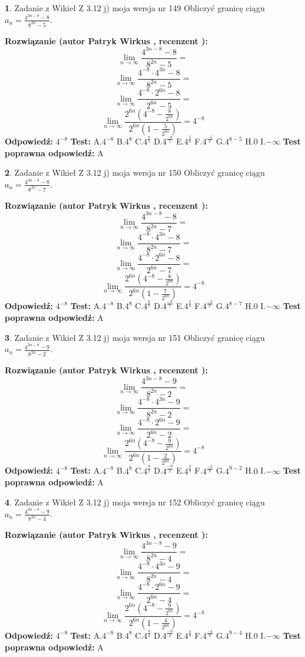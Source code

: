 \documentclass[12pt, a4paper]{article}
\theoremstyle{definition} %
\newtheorem{zad}{}
\newcommand{\zadStart}[1]{\begin{zad}#1\newline}
\newcommand{\zadStop}{\end{zad}}
\newcommand{\rozwStart}[2]{\noindent \textbf{Rozwiązanie (autor #1 , recenzent #2): }\newline}
\newcommand{\rozwStop}{\newline}
\newcommand{\odpStart}{\noindent \textbf{Odpowiedź:}\newline}
\newcommand{\odpStop}{\newline}
\newcommand{\testStart}{\noindent \textbf{Test:}\newline}
\newcommand{\testStop}{\newline}
\newcommand{\kluczStart}{\noindent \textbf{Test poprawna odpowiedź:}\newline}
\newcommand{\kluczStop}{\newline}
\begin{document}
\zadStart{Zadanie z Wikieł Z 3.12 j) moja wersja nr 149}
Obliczyć granicę ciągu $a_{n}=\frac{4^{3n-8}-8}{8^{2n}-5}$.
\zadStop
\rozwStart{Patryk Wirkus}{}
$$\lim\limits_{n\to\infty}\frac{4^{3n-8}-8}{8^{2n}-5}=$$
$$\lim\limits_{n\to\infty}\frac{4^{-8} \cdot 4^{3n}-8}{8^{2n}-5}=$$
$$\lim\limits_{n\to\infty}\frac{4^{-8} \cdot 2^{6n}-8}{2^{6n}-5}=$$
$$\lim\limits_{n\to\infty}\frac{2^{6n}(4^{-8} - \frac{8}{2^{6n}})}{2^{6n}(1-\frac{5}{2^{6n}})}= 4^{-8}$$
\rozwStop
\odpStart
$4^{-8}$
\odpStop
\testStart
A.$4^{-8}$
B.$4^{8}$
C.$4^{\frac{8}{5}}$
D.$4^{\frac{-8}{5}}$
E.$4^{\frac{5}{8}}$
F.$4^{\frac{-5}{8}}$
G.$4^{8-5}$
H.$0$
I.$-\infty$
\testStop
\kluczStart
A
\kluczStop



\zadStart{Zadanie z Wikieł Z 3.12 j) moja wersja nr 150}
Obliczyć granicę ciągu $a_{n}=\frac{4^{3n-8}-8}{8^{2n}-7}$.
\zadStop
\rozwStart{Patryk Wirkus}{}
$$\lim\limits_{n\to\infty}\frac{4^{3n-8}-8}{8^{2n}-7}=$$
$$\lim\limits_{n\to\infty}\frac{4^{-8} \cdot 4^{3n}-8}{8^{2n}-7}=$$
$$\lim\limits_{n\to\infty}\frac{4^{-8} \cdot 2^{6n}-8}{2^{6n}-7}=$$
$$\lim\limits_{n\to\infty}\frac{2^{6n}(4^{-8} - \frac{8}{2^{6n}})}{2^{6n}(1-\frac{7}{2^{6n}})}= 4^{-8}$$
\rozwStop
\odpStart
$4^{-8}$
\odpStop
\testStart
A.$4^{-8}$
B.$4^{8}$
C.$4^{\frac{8}{7}}$
D.$4^{\frac{-8}{7}}$
E.$4^{\frac{7}{8}}$
F.$4^{\frac{-7}{8}}$
G.$4^{8-7}$
H.$0$
I.$-\infty$
\testStop
\kluczStart
A
\kluczStop



\zadStart{Zadanie z Wikieł Z 3.12 j) moja wersja nr 151}
Obliczyć granicę ciągu $a_{n}=\frac{4^{3n-8}-9}{8^{2n}-2}$.
\zadStop
\rozwStart{Patryk Wirkus}{}
$$\lim\limits_{n\to\infty}\frac{4^{3n-8}-9}{8^{2n}-2}=$$
$$\lim\limits_{n\to\infty}\frac{4^{-8} \cdot 4^{3n}-9}{8^{2n}-2}=$$
$$\lim\limits_{n\to\infty}\frac{4^{-8} \cdot 2^{6n}-9}{2^{6n}-2}=$$
$$\lim\limits_{n\to\infty}\frac{2^{6n}(4^{-8} - \frac{9}{2^{6n}})}{2^{6n}(1-\frac{2}{2^{6n}})}= 4^{-8}$$
\rozwStop
\odpStart
$4^{-8}$
\odpStop
\testStart
A.$4^{-8}$
B.$4^{8}$
C.$4^{\frac{9}{2}}$
D.$4^{\frac{-9}{2}}$
E.$4^{\frac{2}{9}}$
F.$4^{\frac{-2}{9}}$
G.$4^{9-2}$
H.$0$
I.$-\infty$
\testStop
\kluczStart
A
\kluczStop



\zadStart{Zadanie z Wikieł Z 3.12 j) moja wersja nr 152}
Obliczyć granicę ciągu $a_{n}=\frac{4^{3n-8}-9}{8^{2n}-4}$.
\zadStop
\rozwStart{Patryk Wirkus}{}
$$\lim\limits_{n\to\infty}\frac{4^{3n-8}-9}{8^{2n}-4}=$$
$$\lim\limits_{n\to\infty}\frac{4^{-8} \cdot 4^{3n}-9}{8^{2n}-4}=$$
$$\lim\limits_{n\to\infty}\frac{4^{-8} \cdot 2^{6n}-9}{2^{6n}-4}=$$
$$\lim\limits_{n\to\infty}\frac{2^{6n}(4^{-8} - \frac{9}{2^{6n}})}{2^{6n}(1-\frac{4}{2^{6n}})}= 4^{-8}$$
\rozwStop
\odpStart
$4^{-8}$
\odpStop
\testStart
A.$4^{-8}$
B.$4^{8}$
C.$4^{\frac{9}{4}}$
D.$4^{\frac{-9}{4}}$
E.$4^{\frac{4}{9}}$
F.$4^{\frac{-4}{9}}$
G.$4^{9-4}$
H.$0$
I.$-\infty$
\testStop
\kluczStart
A
\kluczStop
\end{document}
